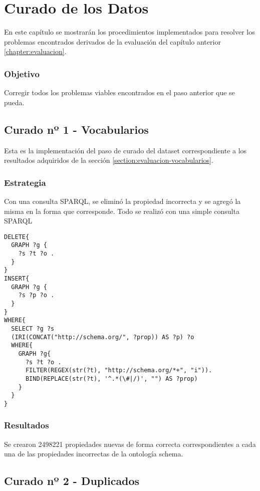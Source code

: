 \chapter{Curado de los Datos}
\label{chapter:curado}

\noindent En este capítulo se mostrarán los procedimientos implementados para resolver los problemas encontrados derivados de la evaluación 
del capítulo anterior \ref{chapter:evaluacion}.

\subsection*{Objetivo}
Corregir todos los problemas viables encontrados en el paso anterior que se pueda.

\section{Curado nº 1 - Vocabularios}
\label{section:curado-vocabularios}

\noindent Esta es la implementación del paso de curado del dataset correspondiente a los resultados adquiridos de la sección \ref{section:evaluacion-vocabularios}.

\subsection*{Estrategia}
Con una consulta SPARQL, se eliminó la propiedad incorrecta y se agregó la misma en la forma que corresponde.
Todo se realizó con una simple consulta SPARQL

\newpage
\begin{lstlisting}[frame=single]  
DELETE{
  GRAPH ?g {
    ?s ?t ?o .
  }
}
INSERT{
  GRAPH ?g {
    ?s ?p ?o .
  }
}
WHERE{
  SELECT ?g ?s 
  (IRI(CONCAT("http://schema.org/", ?prop)) AS ?p) ?o
  WHERE{
    GRAPH ?g{
      ?s ?t ?o .
      FILTER(REGEX(str(?t), "http://schema.org/*+", "i")).
      BIND(REPLACE(str(?t), '^.*(\#|/)', "") AS ?prop)
    }
  }
}
\end{lstlisting}


\subsection*{Resultados}
Se crearon 2498221 propiedades nuevas de forma correcta correspondientes a cada una de las propiedades incorrectas de la ontología 
schema.

\section{Curado nº 2 - Duplicados}
\label{section:curado-duplicados}

